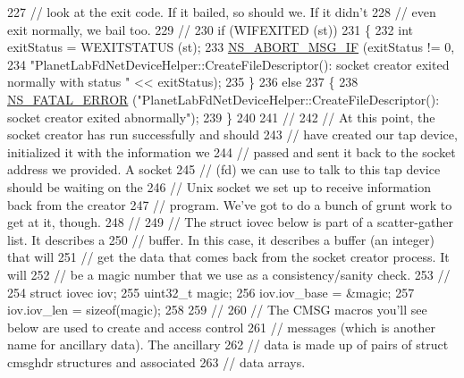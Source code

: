 \begin{DoxyCode}
227       \textcolor{comment}{// look at the exit code.  If it bailed, so should we.  If it didn't}
228       \textcolor{comment}{// even exit normally, we bail too.}
229       \textcolor{comment}{//}
230       \textcolor{keywordflow}{if} (WIFEXITED (st))
231         \{
232           \textcolor{keywordtype}{int} exitStatus = WEXITSTATUS (st);
233           \hyperlink{group__fatal_ga6653324225bc139e46deea177614ceee}{NS\_ABORT\_MSG\_IF} (exitStatus != 0,
234                            \textcolor{stringliteral}{"PlanetLabFdNetDeviceHelper::CreateFileDescriptor(): socket creator exited
       normally with status "} << exitStatus);
235         \}
236       \textcolor{keywordflow}{else}
237         \{
238           \hyperlink{group__fatal_ga5131d5e3f75d7d4cbfd706ac456fdc85}{NS\_FATAL\_ERROR} (\textcolor{stringliteral}{"PlanetLabFdNetDeviceHelper::CreateFileDescriptor(): socket creator
       exited abnormally"});
239         \}
240 
241       \textcolor{comment}{//}
242       \textcolor{comment}{// At this point, the socket creator has run successfully and should}
243       \textcolor{comment}{// have created our tap device, initialized it with the information we}
244       \textcolor{comment}{// passed and sent it back to the socket address we provided.  A socket}
245       \textcolor{comment}{// (fd) we can use to talk to this tap device should be waiting on the}
246       \textcolor{comment}{// Unix socket we set up to receive information back from the creator}
247       \textcolor{comment}{// program.  We've got to do a bunch of grunt work to get at it, though.}
248       \textcolor{comment}{//}
249       \textcolor{comment}{// The struct iovec below is part of a scatter-gather list.  It describes a}
250       \textcolor{comment}{// buffer.  In this case, it describes a buffer (an integer) that will}
251       \textcolor{comment}{// get the data that comes back from the socket creator process.  It will}
252       \textcolor{comment}{// be a magic number that we use as a consistency/sanity check.}
253       \textcolor{comment}{//}
254       \textcolor{keyword}{struct }iovec iov;
255       uint32\_t magic;
256       iov.iov\_base = &magic;
257       iov.iov\_len = \textcolor{keyword}{sizeof}(magic);
258 
259       \textcolor{comment}{//}
260       \textcolor{comment}{// The CMSG macros you'll see below are used to create and access control}
261       \textcolor{comment}{// messages (which is another name for ancillary data).  The ancillary}
262       \textcolor{comment}{// data is made up of pairs of struct cmsghdr structures and associated}
263       \textcolor{comment}{// data arrays.}

\end{DoxyCode}
